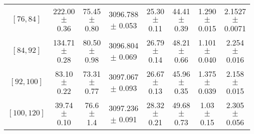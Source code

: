 \begin{tabular}{c||c|c|c|c|c|c|c}
$[76, 84]$ & 222.00 $\pm$ 0.36 & 75.45 $\pm$ 0.80 & 3096.788 $\pm$ 0.053 & 25.30 $\pm$ 0.11 & 44.41 $\pm$ 0.39 & 1.290 $\pm$ 0.015 & 2.1527 $\pm$ 0.0071\\
$[84, 92]$ & 134.71 $\pm$ 0.28 & 80.50 $\pm$ 0.98 & 3096.804 $\pm$ 0.069 & 26.79 $\pm$ 0.14 & 48.21 $\pm$ 0.66 & 1.101 $\pm$ 0.040 & 2.254 $\pm$ 0.016\\
$[92, 100]$ & 83.10 $\pm$ 0.22 & 73.31 $\pm$ 0.77 & 3097.067 $\pm$ 0.093 & 26.67 $\pm$ 0.13 & 45.96 $\pm$ 0.35 & 1.375 $\pm$ 0.039 & 2.158 $\pm$ 0.015\\
$[100, 120]$ & 39.74 $\pm$ 0.10 & 76.6 $\pm$ 1.4 & 3097.236 $\pm$ 0.091 & 28.32 $\pm$ 0.21 & 49.68 $\pm$ 0.73 & 1.03 $\pm$ 0.15 & 2.305 $\pm$ 0.056\\
\end{tabular}
